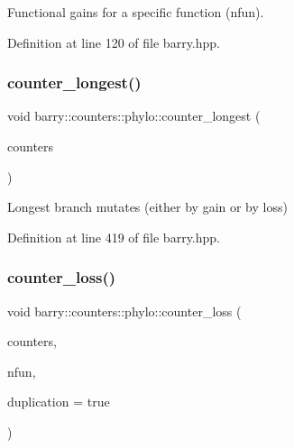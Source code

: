 Functional gains for a specific function ({\ttfamily nfun}). 



Definition at line 120 of file barry.\+hpp.

\mbox{\label{namespacebarry_1_1counters_1_1phylo_ae4ace7c30011a6d7047a94fd0ddf2df2}} 
\subsubsection{\texorpdfstring{counter\+\_\+longest()}{counter\_longest()}}
{\footnotesize\ttfamily void barry\+::counters\+::phylo\+::counter\+\_\+longest (\begin{DoxyParamCaption}\item[{\hyperlink{namespacebarry_1_1counters_1_1phylo_a4e401ffe66d04091343dcffaf915f8c3}{Phylo\+Counters} $\ast$}]{counters }\end{DoxyParamCaption})\hspace{0.3cm}{\ttfamily [inline]}}



Longest branch mutates (either by gain or by loss) 



Definition at line 419 of file barry.\+hpp.

\mbox{\label{namespacebarry_1_1counters_1_1phylo_affbd49d13928ece0a2f100261375d2a7}} 
\subsubsection{\texorpdfstring{counter\+\_\+loss()}{counter\_loss()}}
{\footnotesize\ttfamily void barry\+::counters\+::phylo\+::counter\+\_\+loss (\begin{DoxyParamCaption}\item[{\hyperlink{namespacebarry_1_1counters_1_1phylo_a4e401ffe66d04091343dcffaf915f8c3}{Phylo\+Counters} $\ast$}]{counters,  }\item[{std\+::vector$<$ \hyperlink{namespacebarry_a11dfc53ddb4672278319aa04f1e09a6c}{uint} $>$}]{nfun,  }\item[{bool}]{duplication = {\ttfamily true} }\end{DoxyParamCaption})\hspace{0.3cm}{\ttfamily [inline]}}



